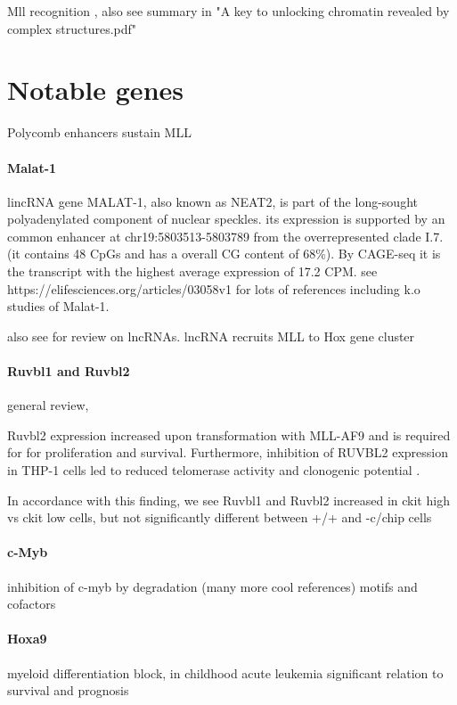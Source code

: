 

\cite{Xue2019} Mll recognition , also see summary in "A key to unlocking chromatin revealed by complex structures.pdf"


\section{Notable genes}
\label{chap:r:degenes:notable}

\cite{Huang2014} Polycomb enhancers sustain MLL

\paragraph{Malat-1}
lincRNA gene MALAT-1, also known as NEAT2, is part of the long-sought polyadenylated component of nuclear speckles.
its expression is supported by an common enhancer at chr19:5803513-5803789 from the overrepresented clade I.7. (it contains 48 CpGs and has a overall CG content of 68\%). By CAGE-seq it is the transcript with the highest average expression of 17.2 CPM.
see https://elifesciences.org/articles/03058v1 for lots of references including k.o studies of Malat-1.

also see \cite{Long2017} for review on lncRNAs. lncRNA recruits MLL to Hox gene cluster \cite{Yang2014}


\paragraph{Ruvbl1 and Ruvbl2}
general review\cite{Mao2017},
\cite{Breig2014}

Ruvbl2 expression increased upon transformation with MLL-AF9 and is required for for proliferation and survival. \cite{Osaki2013} Furthermore, inhibition of RUVBL2 expression in THP-1 cells led to reduced telomerase activity and clonogenic potential \cite{Osaki2013}. 

In accordance with this finding, we see Ruvbl1 and Ruvbl2 increased in ckit high vs ckit low cells, but not significantly different between +/+ and -c/chip cells
\paragraph{c-Myb}
inhibition of c-myb by degradation\cite{Walf-Vorderwuelbecke2017} (many more cool references)
motifs and cofactors \cite{Bengtsen2015}
\cite{Slany2005,Hess2006}
\paragraph{Hoxa9}
myeloid differentiation block\cite{Fujino2001}, in childhood acute leukemia significant relation to survival and prognosis \cite{Adamaki2015}


